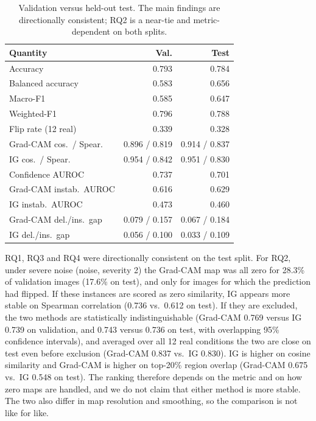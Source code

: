 \documentclass[conference]{IEEEtran}
\begin{document}
\begin{table}[t]
\caption{Validation versus held-out test. The main findings are
directionally consistent; RQ2 is a near-tie and metric-dependent on both
splits.}
\label{tab:test}
\centering
\footnotesize
\setlength{\tabcolsep}{3.5pt}
\begin{tabular}{lrr}
\toprule
Quantity & Val. & Test \\
\midrule
Accuracy & 0.793 & 0.784 \\
Balanced accuracy & 0.583 & 0.656 \\
Macro-F1 & 0.585 & 0.647 \\
Weighted-F1 & 0.796 & 0.788 \\
Flip rate (12 real) & 0.339 & 0.328 \\
Grad-CAM cos.\ / Spear. & 0.896 / 0.819 & 0.914 / 0.837 \\
IG cos.\ / Spear. & 0.954 / 0.842 & 0.951 / 0.830 \\
Confidence AUROC & 0.737 & 0.701 \\
Grad-CAM instab.\ AUROC & 0.616 & 0.629 \\
IG instab.\ AUROC & 0.473 & 0.460 \\
Grad-CAM del./ins.\ gap & 0.079 / 0.157 & 0.067 / 0.184 \\
IG del./ins.\ gap & 0.056 / 0.100 & 0.033 / 0.109 \\
\bottomrule
\end{tabular}
\end{table}

RQ1, RQ3 and RQ4 were directionally consistent on the test split. For RQ2,
under severe noise (noise, severity 2) the Grad-CAM map was all zero for
28.3\% of validation images (17.6\% on test), and only for images for which
the prediction had flipped. If these instances are scored as zero similarity,
IG appears more stable on Spearman correlation (0.736 vs.\ 0.612 on test).
If they are excluded, the two methods are statistically indistinguishable
(Grad-CAM 0.769 versus IG 0.739 on validation, and 0.743 versus 0.736 on
test, with overlapping 95\% confidence intervals), and averaged over all 12
real conditions the two are close on test even before exclusion (Grad-CAM
0.837 vs.\ IG 0.830). IG is higher on cosine similarity and Grad-CAM is
higher on top-20\% region overlap (Grad-CAM 0.675 vs.\ IG 0.548 on test).
The ranking therefore depends on the metric and on how zero maps are
handled, and we do not claim that either method is more stable. The two also
differ in map resolution and smoothing, so the comparison is not like for
like.
\end{document}
